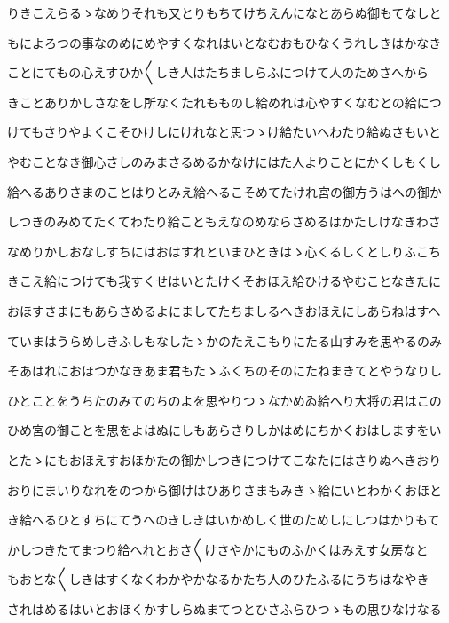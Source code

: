 \documentclass[a4paper,11pt,landscape]{ltjtarticle}
\begin{document}
\par\medskip
りきこえらるゝなめりそれも又とりもちてけちえんになとあらぬ御もてなしと
\par\medskip
もによろつの事なのめにめやすくなれはいとなむおもひなくうれしきはかなき
\par\medskip
ことにてもの心えすひか〱しき人はたちましらふにつけて人のためさへから
\par\medskip
きことありかしさなをし所なくたれもものし給めれは心やすくなむとの給につ
\par\medskip
けてもさりやよくこそひけしにけれなと思つゝけ給たいへわたり給ぬさもいと
\par\medskip
やむことなき御心さしのみまさるめるかなけにはた人よりことにかくしもくし
\par\medskip
給へるありさまのことはりとみえ給へるこそめてたけれ宮の御方うはへの御か
\par\medskip
しつきのみめてたくてわたり給こともえなのめならさめるはかたしけなきわさ
\par\medskip
なめりかしおなしすちにはおはすれといまひときはゝ心くるしくとしりふこち
\par\medskip
きこえ給につけても我すくせはいとたけくそおほえ給ひけるやむことなきたに
\par\medskip
おほすさまにもあらさめるよにましてたちましるへきおほえにしあらねはすへ
\par\medskip
ていまはうらめしきふしもなしたゝかのたえこもりにたる山すみを思やるのみ
\par\medskip
そあはれにおほつかなきあま君もたゝふくちのそのにたねまきてとやうなりし
\par\medskip
ひとことをうちたのみてのちのよを思やりつゝなかめゐ給へり大将の君はこの
\par\medskip
ひめ宮の御ことを思をよはぬにしもあらさりしかはめにちかくおはしますをい
\par\medskip
とたゝにもおほえすおほかたの御かしつきにつけてこなたにはさりぬへきおり
\par\medskip
おりにまいりなれをのつから御けはひありさまもみきゝ給にいとわかくおほと
\par\medskip
き給へるひとすちにてうへのきしきはいかめしく世のためしにしつはかりもて
\par\medskip
かしつきたてまつり給へれとおさ〱けさやかにものふかくはみえす女房なと
\par\medskip
もおとな〱しきはすくなくわかやかなるかたち人のひたふるにうちはなやき
\par\medskip
されはめるはいとおほくかすしらぬまてつとひさふらひつゝもの思ひなけなる
\par\medskip
\end{document}
